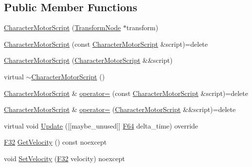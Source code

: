 \subsection*{Public Member Functions}
\begin{DoxyCompactItemize}
\item 
\hyperlink{classmage_1_1_character_motor_script_a3ec398d61411a1d8adaf330f00fdd7ea}{Character\+Motor\+Script} (\hyperlink{classmage_1_1_transform_node}{Transform\+Node} $\ast$transform)
\item 
\hyperlink{classmage_1_1_character_motor_script_aa8b4b2c6eba7077677db51e24c2a9a36}{Character\+Motor\+Script} (const \hyperlink{classmage_1_1_character_motor_script}{Character\+Motor\+Script} \&script)=delete
\item 
\hyperlink{classmage_1_1_character_motor_script_a04180b7c00a5c1c309fe8b1b44f6fd10}{Character\+Motor\+Script} (\hyperlink{classmage_1_1_character_motor_script}{Character\+Motor\+Script} \&\&script)
\item 
virtual \hyperlink{classmage_1_1_character_motor_script_a97b98828d964a0ce38cc424bbf080303}{$\sim$\+Character\+Motor\+Script} ()
\item 
\hyperlink{classmage_1_1_character_motor_script}{Character\+Motor\+Script} \& \hyperlink{classmage_1_1_character_motor_script_a5b66cbbe6b829fe56a1bba5f9093b36e}{operator=} (const \hyperlink{classmage_1_1_character_motor_script}{Character\+Motor\+Script} \&script)=delete
\item 
\hyperlink{classmage_1_1_character_motor_script}{Character\+Motor\+Script} \& \hyperlink{classmage_1_1_character_motor_script_a05e8822fa633d8642702d125b26069f7}{operator=} (\hyperlink{classmage_1_1_character_motor_script}{Character\+Motor\+Script} \&\&script)=delete
\item 
virtual void \hyperlink{classmage_1_1_character_motor_script_a67badc915464773eb874b318bd1f890a}{Update} (\mbox{[}\mbox{[}maybe\+\_\+unused\mbox{]}\mbox{]} \hyperlink{namespacemage_ad26233bbec640deda836e572c1a23708}{F64} delta\+\_\+time) override
\item 
\hyperlink{namespacemage_aa97e833b45f06d60a0a9c4fc22ae02c0}{F32} \hyperlink{classmage_1_1_character_motor_script_a6a8997dfc2d924d803d526ff0fcc9fbd}{Get\+Velocity} () const noexcept
\item 
void \hyperlink{classmage_1_1_character_motor_script_a6978506d9a5e8911ee25e71302f8f850}{Set\+Velocity} (\hyperlink{namespacemage_aa97e833b45f06d60a0a9c4fc22ae02c0}{F32} velocity) noexcept
\end{DoxyCompactItemize}
